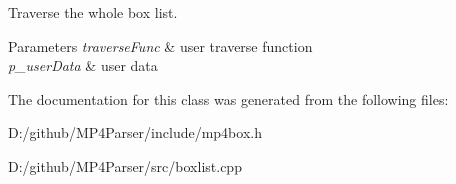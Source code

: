 Traverse the whole box list. 


\begin{DoxyParams}{Parameters}
{\em traverse\+Func} & user traverse function \\
\hline
{\em p\+\_\+user\+Data} & user data \\
\hline
\end{DoxyParams}


The documentation for this class was generated from the following files\+:\begin{DoxyCompactItemize}
\item 
D\+:/github/\+M\+P4\+Parser/include/mp4box.\+h\item 
D\+:/github/\+M\+P4\+Parser/src/boxlist.\+cpp\end{DoxyCompactItemize}
